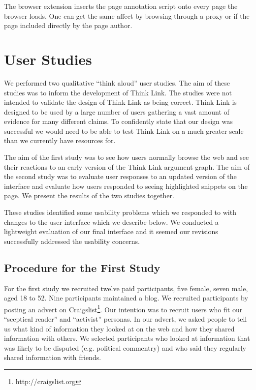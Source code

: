 \documentclass{chi2009}
\newcommand{\todo}[1]{}
\begin{document}
The browser extension inserts the page annotation script onto every page the browser loads. One can get the same affect by browsing through a proxy or if the page included directly by the page author.




\section{User Studies}

We performed two qualitative ``think aloud'' user studies. The aim of these studies was to inform the development of Think Link. The studies were not intended to validate the design of Think Link as being correct. Think Link is designed to be used by a large number of users gathering a vast amount of evidence for many different claims. To confidently state that our design was successful we would need to be able to test Think Link on a much greater scale than we currently have resources for.

The aim of the first study was to see how users normally browse the web and see their reactions to an early version of the Think Link argument graph. The aim of the second study was to evaluate user responses to an updated version of the interface and evaluate how users responded to seeing highlighted snippets on the page. We present the results of the two studies together.

These studies identified some usability problems which we responded to with changes to the user interface which we describe below. We conducted a lightweight evaluation of our final interface and it seemed our revisions successfully addressed the usability concerns.

\todo{Test with at least 4 people}
\todo{Say something about final informal evaluation}


\subsection{Procedure for the First Study}

For the first study we recruited twelve paid participants, five female, seven male, aged 18 to 52. Nine participants maintained a blog. We recruited participants by posting an advert on Craigslist\footnote{http://craigslist.org}.
Our intention was to recruit users who fit our ``sceptical reader'' and ``activist'' personas. In our advert, we asked people to tell us what kind of information they looked at on the web and how they shared information with others. We selected participants who looked at information that was likely to be disputed (e.g. political commentry) and who said they regularly shared information with friends. 
\end{document}
